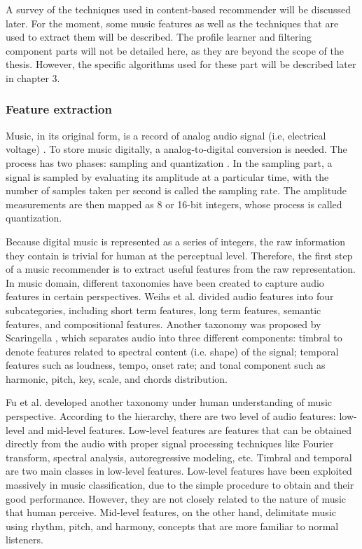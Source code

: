 A survey of the techniques used in content-based recommender will be discussed later. For the moment, some music features as well as the techniques that are used to extract them will be described. The profile learner and filtering component parts will not be detailed here, as they are beyond the scope of the thesis. However, the specific algorithms used for these part will be described later in chapter 3. 

\subsubsection{Feature extraction}
Music, in its original form, is a record of analog audio signal (i.e, electrical voltage) \cite{hodgson2010understanding}. To store music digitally, a analog-to-digital conversion is needed. The process has two phases: sampling and quantization \cite{jurafskyspeech}. In the sampling part, a signal is sampled by evaluating its amplitude at a particular time, with the number of samples taken per second is called the sampling rate. The amplitude measurements are then mapped as 8 or 16-bit integers, whose process is called quantization. 

Because digital music is represented as a series of integers, the raw information they contain is trivial for human at the perceptual level. Therefore, the first step of a music recommender is to extract useful features from the raw representation. In music domain, different taxonomies have been created to capture audio features in certain perspectives. Weihs et al. \cite{weihs2007classification} divided audio features into four subcategories, including short term features, long term features, semantic features, and compositional features. Another taxonomy was proposed by Scaringella \cite{scaringella2006automatic}, which separates audio into three different components: timbral to denote features related to spectral content (i.e. shape) of the signal; temporal features such as loudness, tempo, onset rate; and tonal component such as harmonic, pitch, key, scale, and chords distribution. 

Fu et al. \cite{fu2011survey} developed another taxonomy under human understanding of music perspective. According to the hierarchy, there are two level of audio features: low-level and mid-level features. Low-level features are features that can be obtained directly from the audio with proper signal processing techniques like Fourier transform, spectral analysis, autoregressive modeling, etc. Timbral and temporal are two main classes in low-level features. Low-level features have been exploited massively in music classification, due to the simple procedure to obtain and their good performance. However, they are not closely related to the nature of music that human perceive. Mid-level features, on the other hand, delimitate music using rhythm, pitch, and harmony, concepts that are more familiar to normal listeners. 

